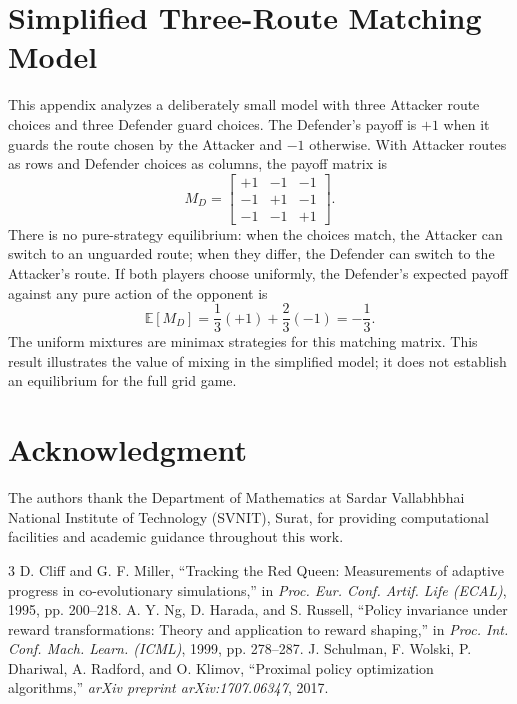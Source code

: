\documentclass[conference]{IEEEtran}
\begin{document}
\appendices
\section{Simplified Three-Route Matching Model}
\label{app:matching}
This appendix analyzes a deliberately small model with three Attacker route choices and three Defender guard choices. The Defender's payoff is $+1$ when it guards the route chosen by the Attacker and $-1$ otherwise. With Attacker routes as rows and Defender choices as columns, the payoff matrix is
\begin{equation}
M_D = \begin{bmatrix} +1 & -1 & -1 \\ -1 & +1 & -1 \\ -1 & -1 & +1 \end{bmatrix}.
\end{equation}
There is no pure-strategy equilibrium: when the choices match, the Attacker can switch to an unguarded route; when they differ, the Defender can switch to the Attacker's route. If both players choose uniformly, the Defender's expected payoff against any pure action of the opponent is
\begin{equation}
\mathbb{E}[M_D] = \frac{1}{3}(+1)+\frac{2}{3}(-1)=-\frac{1}{3}.
\end{equation}
The uniform mixtures are minimax strategies for this matching matrix. This result illustrates the value of mixing in the simplified model; it does not establish an equilibrium for the full grid game.

\section*{Acknowledgment}
The authors thank the Department of Mathematics at Sardar Vallabhbhai National Institute of Technology (SVNIT), Surat, for providing computational facilities and academic guidance throughout this work.

\begin{thebibliography}{3}
 D. Cliff and G. F. Miller, ``Tracking the Red Queen: Measurements of adaptive progress in co-evolutionary simulations,'' in \textit{Proc. Eur. Conf. Artif. Life (ECAL)}, 1995, pp. 200--218.
 A. Y. Ng, D. Harada, and S. Russell, ``Policy invariance under reward transformations: Theory and application to reward shaping,'' in \textit{Proc. Int. Conf. Mach. Learn. (ICML)}, 1999, pp. 278--287.
 J. Schulman, F. Wolski, P. Dhariwal, A. Radford, and O. Klimov, ``Proximal policy optimization algorithms,'' \textit{arXiv preprint arXiv:1707.06347}, 2017.
\end{thebibliography}
\end{document}
